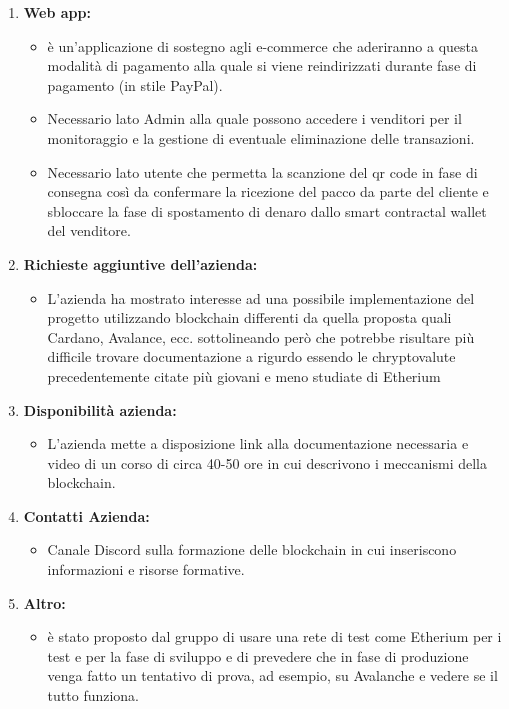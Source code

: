 \begin{enumerate}
	\item \textbf{Web app:}
	\begin{itemize}
		\item è un'applicazione di sostegno agli e-commerce che aderiranno a questa modalità di pagamento alla quale si viene reindirizzati durante fase di pagamento (in stile PayPal).
		\item Necessario lato Admin alla quale possono accedere i venditori per il monitoraggio e la gestione di eventuale eliminazione delle transazioni. 
		\item Necessario lato utente che permetta la scanzione del qr code in fase di consegna così da confermare la ricezione del pacco da parte del cliente e sbloccare la fase di spostamento di denaro dallo smart contract\glo al wallet del venditore.
	\end{itemize}

	\item \textbf{Richieste aggiuntive dell'azienda:}
	\begin{itemize}
		\item L'azienda ha mostrato interesse ad una possibile implementazione del progetto utilizzando blockchain differenti da quella proposta quali Cardano\glo, Avalance\glo, ecc. sottolineando però che potrebbe risultare più difficile trovare documentazione a rigurdo essendo le chryptovalute precedentemente citate più giovani e meno studiate di Etherium\glo
	\end{itemize}

	\item \textbf{Disponibilità azienda:}
	\begin{itemize}
		\item L'azienda mette a disposizione link alla documentazione necessaria e video di un corso di circa 40-50 ore in cui descrivono i meccanismi della blockchain.
		
	\end{itemize}

	\item \textbf{Contatti Azienda:}
	\begin{itemize}
		\item Canale Discord sulla formazione delle blockchain in cui inseriscono informazioni e risorse formative.
	\end{itemize}

	\item \textbf{Altro:}
	\begin{itemize}
		\item è stato proposto dal gruppo di usare una rete di test come Etherium per i test e per la fase di sviluppo e di prevedere che in fase di produzione venga fatto un tentativo di prova, ad esempio, su Avalanche e vedere se il tutto funziona.
	\end{itemize}

\end{enumerate}

